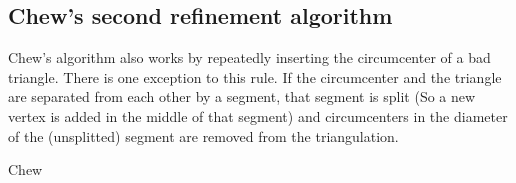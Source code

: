\subsection{Chew's second refinement algorithm}
\label{sub:chews}

Chew's algorithm also works by repeatedly inserting the circumcenter of a bad triangle.
There is one exception to this rule.
If the circumcenter and the triangle are separated from each other by a segment, that segment is split (So a new vertex is added in the middle of that segment) and circumcenters in the diameter of the (unsplitted) segment are removed from the triangulation.
\cite{shewchuk}

\begin{algorithm}
    \caption{Chew}
    \begin{algorithmic}
                \Else
                \EndIf
            \EndWhile
        \EndFunction
    \end{algorithmic}
\end{algorithm}


